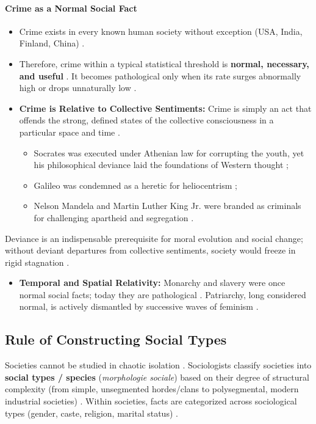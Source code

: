 \paragraph{Crime as a Normal Social Fact}
\begin{itemize}
    \item Crime exists in every known human society without exception (USA, India, Finland, China) .
    \item Therefore, crime within a typical statistical threshold is \textbf{normal, necessary, and useful} . It becomes pathological only when its rate surges abnormally high or drops unnaturally low .
    \item \textbf{Crime is Relative to Collective Sentiments:} Crime is simply an act that offends the strong, defined states of the collective consciousness in a particular space and time .
    \begin{itemize}
        \item Socrates was executed under Athenian law for corrupting the youth, yet his philosophical deviance laid the foundations of Western thought ;
        \item Galileo was condemned as a heretic for heliocentrism ;
        \item Nelson Mandela and Martin Luther King Jr. were branded as criminals for challenging apartheid and segregation .
    \end{itemize}
\end{itemize}

\begin{CriticalPoint}
Deviance is an indispensable prerequisite for moral evolution and social change; without deviant departures from collective sentiments, society would freeze in rigid stagnation .
\end{CriticalPoint}

\begin{itemize}
    \item \textbf{Temporal and Spatial Relativity:} Monarchy and slavery were once normal social facts; today they are pathological . Patriarchy, long considered normal, is actively dismantled by successive waves of feminism .
\end{itemize}

\subsection{Rule of Constructing Social Types}
Societies cannot be studied in chaotic isolation . Sociologists classify societies into \textbf{social types / species} (\textit{morphologie sociale}) based on their degree of structural complexity (from simple, unsegmented hordes/clans to polysegmental, modern industrial societies) . Within societies, facts are categorized across sociological types (gender, caste, religion, marital status) .

